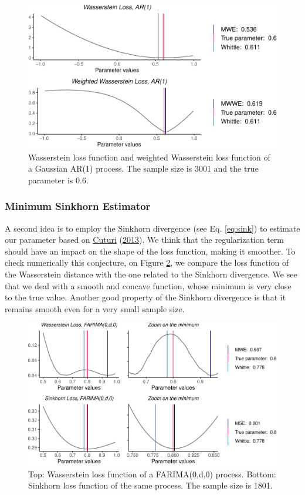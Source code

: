 \documentclass[
  11pt,
]{article}
\begin{document}
\begin{figure}

{\centering \includegraphics[width=0.6\linewidth]{Master_thesis_V5_files/figure-latex/wass_ar1_weighted-1} 

}

\caption{Wasserstein loss function and weighted Wasserstein loss function of a Gaussian AR(1) process. The sample size is 3001 and the true parameter is 0.6.}\label{fig:wass_ar1_weighted}
\end{figure}

\hypertarget{minimum-sinkhorn-estimator}{%
\subsubsection{Minimum Sinkhorn
Estimator}\label{minimum-sinkhorn-estimator}}

A second idea is to employ the Sinkhorn divergence (see Eq.
\ref{eq:sink}) to estimate our parameter based on
\protect\hyperlink{ref-cuturi2013sinkhorn}{Cuturi}
(\protect\hyperlink{ref-cuturi2013sinkhorn}{2013}). We think that the
regularization term should have an impact on the shape of the loss
function, making it smoother. To check numerically this conjecture, on
Figure \ref{fig:sinkhorn}, we compare the loss function of the
Wasserstein distance with the one related to the Sinkhorn divergence. We
see that we deal with a smooth and concave function, whose minimum is
very close to the true value. Another good property of the Sinkhorn
divergence is that it remains smooth even for a very small sample size.

\begin{figure}

{\centering \includegraphics[width=0.65\linewidth]{Master_thesis_V5_files/figure-latex/sinkhorn-1} 

}

\caption{Top: Wasserstein loss function of a FARIMA(0,d,0) process. Bottom: Sinkhorn loss function of the same process. The sample size is 1801.}\label{fig:sinkhorn}
\end{figure}
\end{document}
